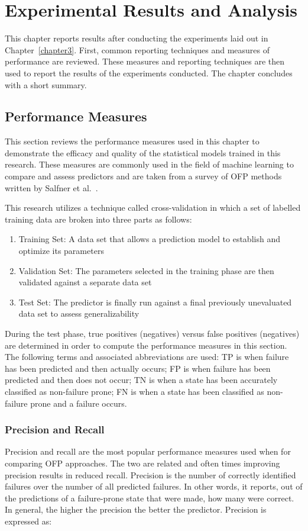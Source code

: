 \chapter{Experimental Results and Analysis} \label{chapter4}
This chapter reports results after conducting the experiments laid out in
Chapter~\ref{chapter3}.  First, common reporting techniques and measures of
performance are reviewed.  These measures and reporting techniques are then
used to report the results of the experiments conducted.  The chapter concludes
with a short summary.

\section{Performance Measures} \label{metrics}
This section reviews the performance measures used in this chapter to
demonstrate the efficacy and quality of the statistical models trained in this
research.  These measures are commonly used in the field of machine learning to
compare and assess predictors and are taken from a survey of \ac{OFP} methods
written by Salfner et al.~\cite{salfnerSurvey}.

This research utilizes a technique called cross-validation in which a set of
labelled training data are broken into three parts as follows:
\begin{enumerate}
\item{Training Set:  A data set that allows a prediction model to establish and
optimize its parameters}
\item{Validation Set:  The parameters selected in the training phase are then
validated against a separate data set}
\item{Test Set:  The predictor is finally run against a final previously
unevaluated data set to assess generalizability}
\end{enumerate}
During the test phase, true positives (negatives) versus false positives
(negatives) are determined in order to compute the performance measures in this
section.  The following terms and associated abbreviations are used: \ac{TP} is
when failure has been predicted and then actually occurs; \ac{FP} is when
failure has been predicted and then does not occur; \ac{TN} is when a state has
been accurately classified as non-failure prone; \ac{FN} is when a state has
been classified as non-failure prone and a failure occurs.

\subsection{Precision and Recall}
Precision and recall are the most popular performance measures used when
for comparing \ac{OFP} approaches.  The two are related and often times
improving precision results in reduced recall.  Precision is the number of
correctly identified failures over the number of all predicted failures.  In
other words, it reports, out of the predictions of a failure-prone state that
were made, how many were correct.  In general, the higher the precision the
better the predictor.  Precision is expressed as:

